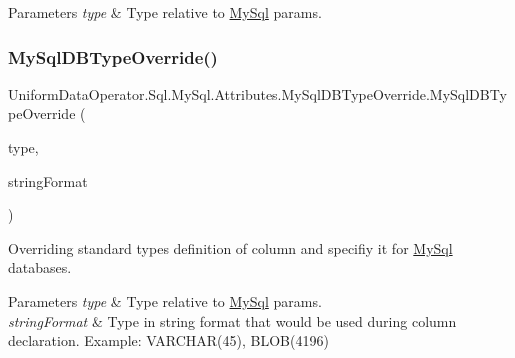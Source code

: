 \begin{DoxyParams}{Parameters}
{\em type} & Type relative to \mbox{\hyperlink{namespace_uniform_data_operator_1_1_sql_1_1_my_sql}{My\+Sql}} params.\\
\hline
\end{DoxyParams}
\mbox{\label{class_uniform_data_operator_1_1_sql_1_1_my_sql_1_1_attributes_1_1_my_sql_d_b_type_override_acd28e7a908283c3cb18a0c83e701b85e}} 
\subsubsection{\texorpdfstring{My\+Sql\+D\+B\+Type\+Override()}{MySqlDBTypeOverride()}\hspace{0.1cm}{\footnotesize\ttfamily [2/2]}}
{\footnotesize\ttfamily Uniform\+Data\+Operator.\+Sql.\+My\+Sql.\+Attributes.\+My\+Sql\+D\+B\+Type\+Override.\+My\+Sql\+D\+B\+Type\+Override (\begin{DoxyParamCaption}\item[{My\+Sql\+Db\+Type}]{type,  }\item[{string}]{string\+Format }\end{DoxyParamCaption})}



Overriding standard type\textquotesingle{}s definition of column and specifiy it for \mbox{\hyperlink{namespace_uniform_data_operator_1_1_sql_1_1_my_sql}{My\+Sql}} databases. 


\begin{DoxyParams}{Parameters}
{\em type} & Type relative to \mbox{\hyperlink{namespace_uniform_data_operator_1_1_sql_1_1_my_sql}{My\+Sql}} params.\\
\hline
{\em string\+Format} & Type in string format that would be used during column declaration. Example\+: V\+A\+R\+C\+H\+A\+R(45), B\+L\+O\+B(4196)\\
\hline
\end{DoxyParams}


